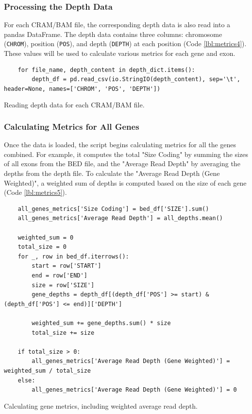 \subsubsection{\textbf{Processing the Depth Data}}

For each CRAM/BAM file, the corresponding depth data is also read into a pandas DataFrame. The depth data contains three columns: chromosome (\texttt{CHROM}), position (\texttt{POS}), and depth (\texttt{DEPTH}) at each position (Code \ref{lbl:metrics4}). These values will be used to calculate various metrics for each gene and exon.

\begin{longlisting}
\begin{verbatim}
    for file_name, depth_content in depth_dict.items():
        depth_df = pd.read_csv(io.StringIO(depth_content), sep='\t', header=None, names=['CHROM', 'POS', 'DEPTH'])
\end{verbatim}
\caption{Reading depth data for each CRAM/BAM file.}
\label{lbl:metrics4}
\end{longlisting}

\subsubsection{\textbf{Calculating Metrics for All Genes}}

Once the data is loaded, the script begins calculating metrics for all the genes combined. For example, it computes the total "Size Coding" by summing the sizes of all exons from the BED file, and the "Average Read Depth" by averaging the depths from the depth file. To calculate the "Average Read Depth (Gene Weighted)", a weighted sum of depths is computed based on the size of each gene (Code \ref{lbl:metrics5}).

\begin{longlisting}
\begin{verbatim}
    all_genes_metrics['Size Coding'] = bed_df['SIZE'].sum()
    all_genes_metrics['Average Read Depth'] = all_depths.mean()

    weighted_sum = 0
    total_size = 0
    for _, row in bed_df.iterrows():
        start = row['START']
        end = row['END']
        size = row['SIZE']
        gene_depths = depth_df[(depth_df['POS'] >= start) & (depth_df['POS'] <= end)]['DEPTH']

        weighted_sum += gene_depths.sum() * size
        total_size += size

    if total_size > 0:
        all_genes_metrics['Average Read Depth (Gene Weighted)'] = weighted_sum / total_size
    else:
        all_genes_metrics['Average Read Depth (Gene Weighted)'] = 0
\end{verbatim}
\caption{Calculating gene metrics, including weighted average read depth.}
\label{lbl:metrics5}
\end{longlisting}

